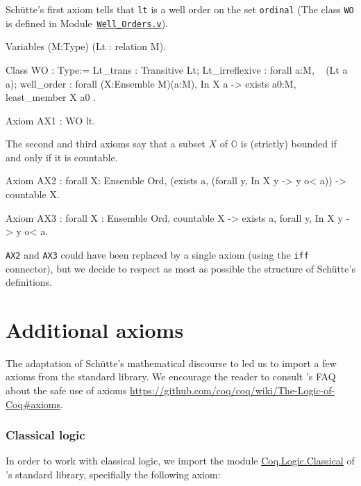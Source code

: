 Schütte's first axiom tells that \texttt{lt} is a well order on the set 
\texttt{ordinal} (The  class \texttt{WO} is defined in
Module~\href{../src/html/hydras.Schutte.Well_Orders.html}%
{\texttt{Well\_Orders.v}}).

\label{types:WO}

\begin{Coqsrc}
Variables (M:Type)
         (Lt : relation M).
  
Class WO : Type:=
    {
      Lt_trans : Transitive  Lt;
      Lt_irreflexive : forall a:M, ~ (Lt a a);
      well_order : forall (X:Ensemble M)(a:M),
          In X a ->
          exists a0:M, least_member  X a0
    }.
\end{Coqsrc}



\begin{Coqsrc}
  Axiom AX1 : WO lt.
\end{Coqsrc}

The second and third axioms say that a subset $X$ of $\mathbb{O}$ is
(strictly) bounded if and only if it is countable. 



\begin{Coqsrc}
Axiom AX2 : forall X: Ensemble Ord, 
   (exists a,  (forall y, In X y -> y o< a)) ->
   countable X.

Axiom AX3 : forall X : Ensemble Ord,
              countable X -> 
              exists a,  forall y, In X y -> y o< a.
\end{Coqsrc}

\texttt{AX2} and \texttt{AX3} could have been replaced by a single axiom (using the \texttt{iff} connector), but we decide to respect as most as possible the structure of Schütte's definitions.

\section{Additional  axioms}

The adaptation of Schütte's mathematical discourse to \coq{} led us to
import a few axioms from the standard library. We encourage the reader to consult \coq{}'s FAQ about the safe use of axioms
 \url{https://github.com/coq/coq/wiki/The-Logic-of-Coq#axioms}.

\subsubsection{Classical logic}

In order to work with classical logic, we import the module
\href{https://coq.inria.fr/distrib/current/stdlib/Coq.Logic.Classical.html}{Coq.Logic.Classical}  of \coq{}'s standard library, specifially the following axiom:

